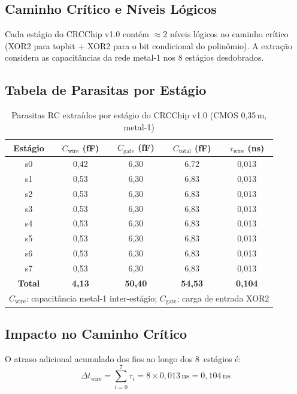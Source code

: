 \documentclass[12pt,a4paper]{article}
\begin{document}
\subsection{Caminho Crítico e Níveis Lógicos}

Cada estágio do CRCChip v1.0 contém $\approx$2 níveis lógicos no caminho crítico (XOR2 para topbit + XOR2 para o bit condicional do polinômio). A extração considera as capacitâncias da rede metal-1 nos 8 estágios desdobrados.

\subsection{Tabela de Parasitas por Estágio}

\begin{table}[h!]
\centering
\caption{Parasitas RC extraídos por estágio do CRCChip v1.0 (CMOS 0,35\,\textmu m, metal-1)}
\label{tab:parasitas}
\begin{tabular}{ccccc}
\toprule
\textbf{Estágio} & \textbf{$C_{\text{wire}}$ (fF)} & \textbf{$C_{\text{gate}}$ (fF)} & \textbf{$C_{\text{total}}$ (fF)} & \textbf{$\tau_{\text{wire}}$ (ns)} \\
\midrule
s0 & 0,42 & 6,30 & 6,72 & 0,013 \\
s1 & 0,53 & 6,30 & 6,83 & 0,013 \\
s2 & 0,53 & 6,30 & 6,83 & 0,013 \\
s3 & 0,53 & 6,30 & 6,83 & 0,013 \\
s4 & 0,53 & 6,30 & 6,83 & 0,013 \\
s5 & 0,53 & 6,30 & 6,83 & 0,013 \\
s6 & 0,53 & 6,30 & 6,83 & 0,013 \\
s7 & 0,53 & 6,30 & 6,83 & 0,013 \\
\midrule
\textbf{Total} & \textbf{4,13} & \textbf{50,40} & \textbf{54,53} & \textbf{0,104} \\
\bottomrule
\multicolumn{5}{r}{\small $C_{\text{wire}}$: capacitância metal-1 inter-estágio; $C_{\text{gate}}$: carga de entrada XOR2}
\end{tabular}
\end{table}

\subsection{Impacto no Caminho Crítico}

O atraso adicional acumulado dos fios ao longo dos 8~estágios é:
\begin{equation}
  \Delta t_{\text{wire}} = \sum_{i=0}^{7} \tau_i = 8 \times 0{,}013\,\text{ns} = 0{,}104\,\text{ns}
\end{equation}
\end{document}
